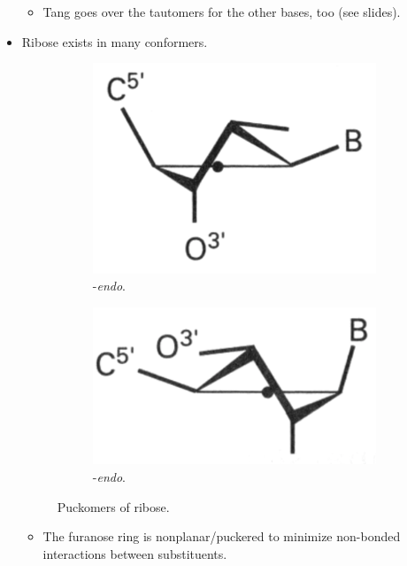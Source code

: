 \documentclass[../notes.tex]{subfiles}
\begin{document}
\begin{itemize}
\begin{itemize}
        \item Tang goes over the tautomers for the other bases, too (see slides).
    \end{itemize}
    \item Ribose exists in many conformers.
    \begin{figure}[h!]
        \centering
        \begin{subfigure}[b]{0.2\linewidth}
            \centering
            \includegraphics[width=0.8\linewidth]{../ExtFiles/puckomersa.png}
            \caption{-\emph{endo}.}
            \label{fig:puckomersa}
        \end{subfigure}
        \begin{subfigure}[b]{0.2\linewidth}
            \centering
            \includegraphics[width=0.8\linewidth]{../ExtFiles/puckomersb.png}
            \caption{-\emph{endo}.}
            \label{fig:puckomersb}
        \end{subfigure}
        \caption{Puckomers of ribose.}
        \label{fig:puckomers}
    \end{figure}
    \begin{itemize}
        \item The furanose ring is nonplanar/puckered to minimize non-bonded interactions between substituents.

\end{itemize}
\end{itemize}
\end{document}
